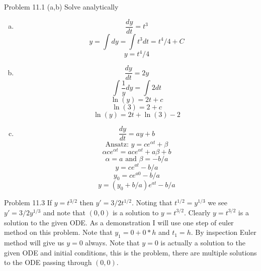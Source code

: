 \documentclass[12pt]{article}
\makeatletter
\theoremstyle{homework}
\newenvironment{exercise}[1]
{\def\@currentlabel{#1}\exercisecore}
{\endexercisecore}
\makeatother
\begin{document}
\begin{exercise}
4
Problem 11.1 (a,b)
\end{exercise}
Solve analytically
\begin{enumerate}[(a)]
\item
$$\frac{dy}{dt}=t^3$$
$$y=\int dy=\int t^3dt=t^4/4+C$$
$$y=t^4/4$$
\item
$$\frac{dy}{dt}=2y$$
$$\int \frac{1}{y} dy=\int 2 dt$$
$$\ln (y)=2t+c$$
$$\ln (3)=2+c$$
$$\ln (y)=2t+\ln (3)-2$$
\item
$$\frac{dy}{dt}=ay+b$$
$$\text{Ansatz: } y=ce^{\alpha t}+\beta$$
$$\alpha ce^{\alpha t} =ace^{\alpha t}+a\beta+b$$
$$\alpha=a\text{ and } \beta=-b/a$$
$$y=ce^{a t}-b/a$$
$$y_0=ce^{a 0}-b/a$$
$$y=(y_0+b/a)e^{a t}-b/a$$
\end{enumerate}

\begin{exercise}
5
Problem 11.3
\end{exercise}
If $y=t^{3/2}$ then $y'=3/2t^{1/2}$.  Noting that $t^{1/2}=y^{1/3}$ we see $y'=3/2y^{1/3}$ and note that $(0,0)$ is a solution to $y=t^{3/2}$.  Clearly $y=t^{3/2}$ is a solution to the given ODE.  As a demonstration I will use one step of euler method on this problem.  Note that $y_1=0+0*h$ and $t_1=h$.  By inspection Euler method will give us $y=0$ always.  Note that $y=0$ is actually a solution to the given ODE and initial conditions, this is the problem, there are multiple solutions to the ODE passing through $(0,0)$.
\end{document}
